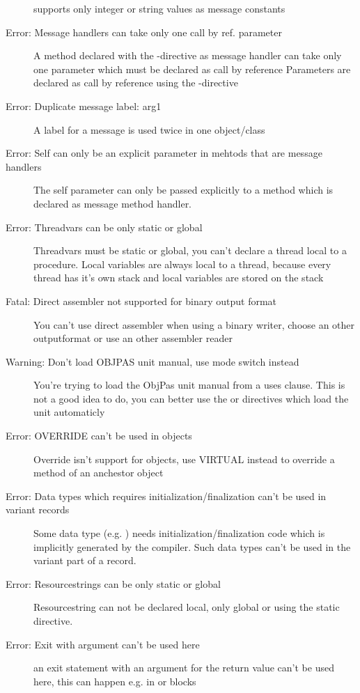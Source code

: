 \begin{description}
 \fpc supports only integer or string values as message constants
\item [Error: Message handlers can take only one call by ref. parameter]
 A method declared with the -directive as message handler
 can take only one parameter which must be declared as call by reference
 Parameters are declared as call by reference using the -directive
\item [Error: Duplicate message label: arg1]
 A label for a message is used twice in one object/class
\item [Error: Self can only be an explicit parameter in mehtods that are message handlers]
 The self parameter can only be passed explicitly to a method which
 is declared as message method handler.
\item [Error: Threadvars can be only static or global]
 Threadvars must be static or global, you can't declare a thread
 local to a procedure. Local variables are always local to a thread,
 because every thread has it's own stack and local variables
 are stored on the stack
\item [Fatal: Direct assembler not supported for binary output format]
 You can't use direct assembler when using a binary writer, choose an
 other outputformat or use an other assembler reader
\item [Warning: Don't load OBJPAS unit manual, use mode switch instead]
 You're trying to load the ObjPas unit manual from a uses clause. This is
 not a good idea to do, you can better use the  or
 directives which load the unit automaticly
\item [Error: OVERRIDE can't be used in objects]
 Override isn't support for objects, use VIRTUAL instead to override
 a method of an anchestor object
\item [Error: Data types which requires initialization/finalization can't be used in variant records]
 Some data type (e.g. ) needs initialization/finalization
 code which is implicitly generated by the compiler. Such data types
 can't be used in the variant part of a record.
\item [Error: Resourcestrings can be only static or global]
 Resourcestring can not be declared local, only global or using the static
 directive.
\item [Error: Exit with argument can't be used here]
 an exit statement with an argument for the return value can't be used here, this
 can happen e.g. in  or  blocks

\end{description}
